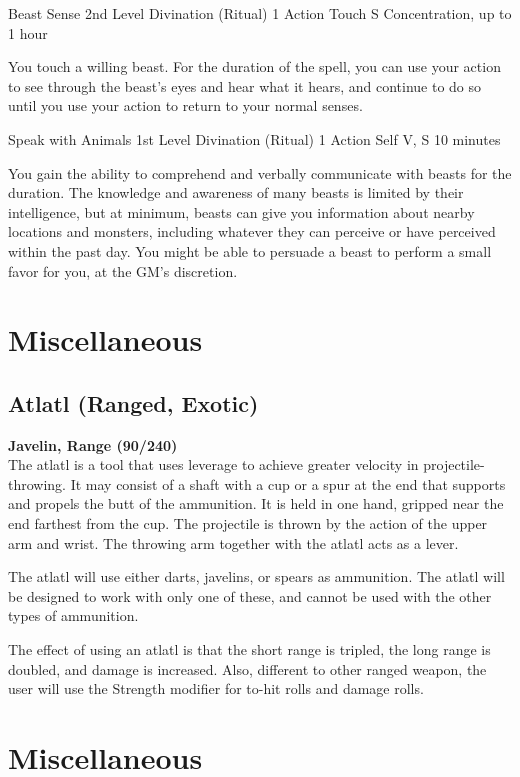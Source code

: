 \documentclass[letterpaper,openany,oneside,twocolumn]{book}
\begin{document}
\DndSpellHeader
  {Beast Sense}
  {2nd Level Divination (Ritual)}
  {1 Action}
  {Touch}
  {S}
  {Concentration, up to 1 hour}

You touch a willing beast. For the duration of the spell, you can use your action to see through the beast’s eyes and hear what it hears, and continue to do so until you use your action to return to your normal senses.

\DndSpellHeader
  {Speak with Animals}
  {1st Level Divination (Ritual)}
  {1 Action}
  {Self}
  {V, S}
  {10 minutes}

You gain the ability to comprehend and verbally communicate with beasts for the duration. The knowledge and awareness of many beasts is limited by their intelligence, but at minimum, beasts can give you information about nearby locations and monsters, including whatever they can perceive or have perceived within the past day. You might be able to persuade a beast to perform a small favor for you, at the GM’s discretion.

\section*{Miscellaneous}
\subsection*{Atlatl (Ranged, Exotic)}
\textbf{Javelin, Range (90/240)}\\
The atlatl is a tool that uses leverage to achieve greater velocity in projectile-throwing. It may consist of a shaft with a cup or a spur at the end that supports and propels the butt of the ammunition. It is held in one hand, gripped near the end farthest from the cup. The projectile is thrown by the action of the upper arm and wrist. The throwing arm together with the atlatl acts as a lever.

The atlatl will use either darts, javelins, or spears as ammunition. The atlatl will be designed to work with only one of these, and cannot be used with the other types of ammunition.

The effect of using an atlatl is that the short range is tripled, the long range is doubled, and damage is increased. Also, different to other ranged weapon, the user will use the Strength modifier for to-hit rolls and damage rolls.

\section*{Miscellaneous}
\end{document}
